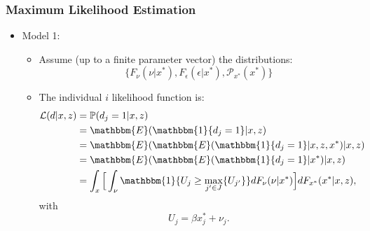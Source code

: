 \begin{frame}
\frametitle{Maximum Likelihood Estimation}

\begin{itemize}
	\item Model 1:
	\begin{itemize}
		\item Assume (up to a finite parameter vector) the distributions: 
		\begin{equation*}
		\{F_{\nu}(\nu|x^{*}), F_{\epsilon}(\epsilon|x^{*}), \mathcal{P}_{x^{*}}(x^{*})\}
		\end{equation*}
		\item The individual $i$ likelihood function is:
		\begin{equation*}
		\begin{split}
		\mathcal{L}(d|x,z)&=\mathbb{P}(d_{j}=1|x,z)\\
		&=\mathbbm{E}(\mathbbm{1}\{d_{j}=1\}|x,z)\\
		&=\mathbbm{E}(\mathbbm{E}(\mathbbm{1}\{d_{j}=1\}|x,z,x^{*})|x,z)\\
		&=\mathbbm{E}(\mathbbm{E}(\mathbbm{1}\{d_{j}=1\}|x^{*})|x,z)\\
		&=\int_{x}\Big[\int_{\nu}\mathbbm{1}\{U_{j}\geq\max_{j'\in J}\{U_{j'}\}\}dF_{\nu}(\nu|x^{*})\Big]dF_{x^{*}}(x^{*}|x,z),\\
		\end{split}
		\end{equation*}
		with
		\begin{equation*}
		U_{j}=\beta x^{*}_{j}+\nu_{j}.
		\end{equation*}
	\end{itemize}
\end{itemize}
\end{frame}
